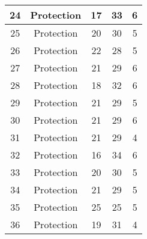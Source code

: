 \documentclass[results.tex]{subfiles}
\begin{document}
\begin{center}
\begin{tabular}{| c || c | c | c | c |}
            \hline
            24                      & Protection                   & 17                     & 33                      & 6                    \\
            \hline
            25                      & Protection                   & 20                     & 30                      & 5                    \\
            \hline
            26                      & Protection                   & 22                     & 28                      & 5                    \\
            \hline
            27                      & Protection                   & 21                     & 29                      & 6                    \\
            \hline
            28                      & Protection                   & 18                     & 32                      & 6                    \\
            \hline
            29                      & Protection                   & 21                     & 29                      & 5                    \\
            \hline
            30                      & Protection                   & 21                     & 29                      & 6                    \\
            \hline
            31                      & Protection                   & 21                     & 29                      & 4                    \\
            \hline
            32                      & Protection                   & 16                     & 34                      & 6                    \\
            \hline
            33                      & Protection                   & 20                     & 30                      & 5                    \\
            \hline
            34                      & Protection                   & 21                     & 29                      & 5                    \\
            \hline
            35                      & Protection                   & 25                     & 25                      & 5                    \\
            \hline
            36                      & Protection                   & 19                     & 31                      & 4                    \\

\end{tabular}
\end{center}
\end{document}
